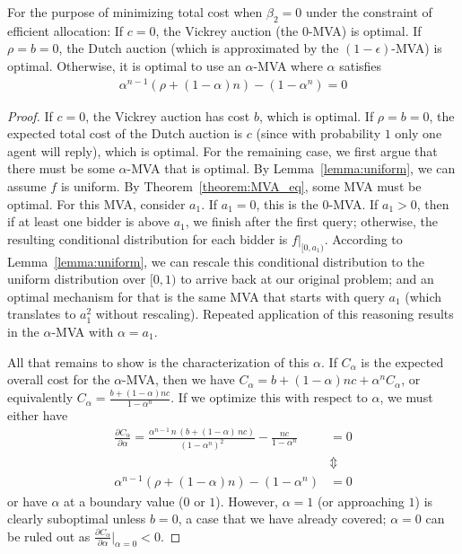 \begin{proposition}
For the purpose of minimizing total cost when $\beta_2=0$ under the constraint of efficient allocation:
If $c = 0$, the Vickrey auction (the $0$-MVA) is optimal.
If $\rho = b = 0$, the Dutch auction (which is approximated by the
$(1-\epsilon)$-MVA) is optimal.  
Otherwise, it is optimal to use an $\alpha$-MVA where $\alpha$ satisfies
\begin{align}\label{eq:alpha}
\alpha^{n-1} (\rho + (1-\alpha)n) - (1-\alpha^n) = 0
\end{align}
\end{proposition}
\begin{proof}
If $c=0$, the Vickrey auction has cost $b$, which is optimal.
If $\rho=b=0$, the expected total cost of the Dutch auction is $c$ (since
with probability $1$ only one agent will reply), which is optimal.
For the remaining case, we first argue that there must be some $\alpha$-MVA
that is optimal.  
By  Lemma~\ref{lemma:uniform}, we can assume $f$ is uniform.
By Theorem~\ref{theorem:MVA_eq}, some MVA must be
optimal.  For this MVA, consider $a_1$.  If $a_1=0$, this is the
$0$-MVA. If $a_1>0$, then if at least one bidder is above $a_1$, we finish after
the first query; otherwise, the resulting conditional distribution for each
bidder is $f|_{[0,a_1)}$. According to Lemma~\ref{lemma:uniform}, we can
rescale this conditional distribution to the uniform distribution over
$[0,1)$ to arrive back at our original problem; and an optimal mechanism
for that is the same MVA that starts with query $a_1$ (which translates to
$a_1^2$ without rescaling).  Repeated application of this reasoning results
in the $\alpha$-MVA with $\alpha=a_1$.

All that remains to show is the characterization of this $\alpha$.
If $C_\alpha$ is the expected overall cost for the $\alpha$-MVA, then we
have $C_\alpha = b + (1-\alpha)nc + \alpha^n C_\alpha$, or equivalently 
$C_\alpha = \frac{b+(1-\alpha)nc }{ 1-\alpha^n}$.
If we optimize this with respect to $\alpha$, we must either have
\begin{align*}
\frac{\partial C_\alpha}{\partial \alpha} = \frac{{\alpha}^{n-1}\,n\,\left(
b+\left( 1-\alpha\right) \,nc\right) }{{\left( 1-{\alpha}^{n}\right)
}^{2}}-\frac{nc}{1-{\alpha}^{n}} &= 0 \nonumber\\
&\Updownarrow\nonumber\\
\alpha^{n-1} (\rho + (1-\alpha)n) - (1-\alpha^n) &= 0
\end{align*}
or have $\alpha$ at a boundary value ($0$ or $1$). However, $\alpha=1$ (or
approaching $1$) is clearly suboptimal unless $b=0$, a case that we have
already covered; $\alpha=0$ can be ruled out as $\frac{\partial
  C_\alpha}{\partial \alpha} |_{\alpha = 0} < 0$.
\end{proof}


